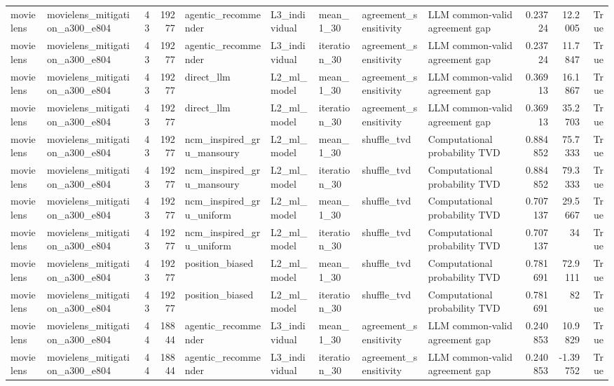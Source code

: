 \begin{table}[htbp!]
\begin{tabular}{llrrlllllrrr}
movielens & movielens\_mitigation\_a300\_e804 & 43 & 19277 & agentic\_recommender & L3\_individual & mean\_1\_30 & agreement\_sensitivity & LLM common-valid agreement gap & 0.23724 & 12.2005 & True \\
movielens & movielens\_mitigation\_a300\_e804 & 43 & 19277 & agentic\_recommender & L3\_individual & iteration\_30 & agreement\_sensitivity & LLM common-valid agreement gap & 0.23724 & 11.7847 & True \\
movielens & movielens\_mitigation\_a300\_e804 & 43 & 19277 & direct\_llm & L2\_ml\_model & mean\_1\_30 & agreement\_sensitivity & LLM common-valid agreement gap & 0.36913 & 16.1867 & True \\
movielens & movielens\_mitigation\_a300\_e804 & 43 & 19277 & direct\_llm & L2\_ml\_model & iteration\_30 & agreement\_sensitivity & LLM common-valid agreement gap & 0.36913 & 35.2703 & True \\
movielens & movielens\_mitigation\_a300\_e804 & 43 & 19277 & ncm\_inspired\_gru\_mansoury & L2\_ml\_model & mean\_1\_30 & shuffle\_tvd & Computational probability TVD & 0.884852 & 75.7333 & True \\
movielens & movielens\_mitigation\_a300\_e804 & 43 & 19277 & ncm\_inspired\_gru\_mansoury & L2\_ml\_model & iteration\_30 & shuffle\_tvd & Computational probability TVD & 0.884852 & 79.3333 & True \\
movielens & movielens\_mitigation\_a300\_e804 & 43 & 19277 & ncm\_inspired\_gru\_uniform & L2\_ml\_model & mean\_1\_30 & shuffle\_tvd & Computational probability TVD & 0.707137 & 29.5667 & True \\
movielens & movielens\_mitigation\_a300\_e804 & 43 & 19277 & ncm\_inspired\_gru\_uniform & L2\_ml\_model & iteration\_30 & shuffle\_tvd & Computational probability TVD & 0.707137 & 34 & True \\
movielens & movielens\_mitigation\_a300\_e804 & 43 & 19277 & position\_biased & L2\_ml\_model & mean\_1\_30 & shuffle\_tvd & Computational probability TVD & 0.781691 & 72.9111 & True \\
movielens & movielens\_mitigation\_a300\_e804 & 43 & 19277 & position\_biased & L2\_ml\_model & iteration\_30 & shuffle\_tvd & Computational probability TVD & 0.781691 & 82 & True \\
movielens & movielens\_mitigation\_a300\_e804 & 44 & 18844 & agentic\_recommender & L3\_individual & mean\_1\_30 & agreement\_sensitivity & LLM common-valid agreement gap & 0.240853 & 10.9829 & True \\
movielens & movielens\_mitigation\_a300\_e804 & 44 & 18844 & agentic\_recommender & L3\_individual & iteration\_30 & agreement\_sensitivity & LLM common-valid agreement gap & 0.240853 & -1.39752 & True \\

\end{tabular}
\end{table}
